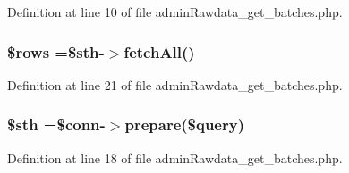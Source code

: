 Definition at line 10 of file admin\-Rawdata\-\_\-get\-\_\-batches.\-php.

\hypertarget{admin_batch_2admin_rawdata__get__batches_8php_ace2ec39e7df3899fa8df9640ec274b03}{
\subsubsection[{\$rows}]{\setlength{\rightskip}{0pt plus 5cm}\$rows =\$sth-\/$>$fetch\-All()}}\label{admin_batch_2admin_rawdata__get__batches_8php_ace2ec39e7df3899fa8df9640ec274b03}


Definition at line 21 of file admin\-Rawdata\-\_\-get\-\_\-batches.\-php.

\hypertarget{admin_batch_2admin_rawdata__get__batches_8php_afa9126f9664959c02795be300a135f93}{
\subsubsection[{\$sth}]{\setlength{\rightskip}{0pt plus 5cm}\$sth =\$conn-\/$>$prepare(\$query)}}\label{admin_batch_2admin_rawdata__get__batches_8php_afa9126f9664959c02795be300a135f93}


Definition at line 18 of file admin\-Rawdata\-\_\-get\-\_\-batches.\-php.

